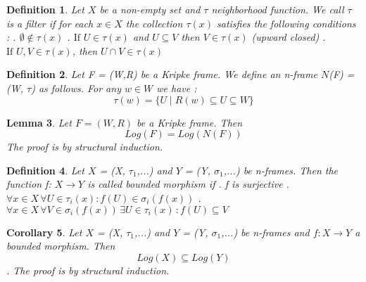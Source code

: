 \documentclass[12pt, a4paper]{scrartcl}
\newtheorem{definition}{Definition}[subsection]
\newtheorem{lemma}[definition]{Lemma}
\newtheorem{corollary}[definition]{Corollary}
\begin{document}
\begin{definition}
    Let $X$ be a non-empty set and $\tau$ neighborhood function. We call $\tau$ is a filter if for each $x\in X$ the collection $\tau(x)$
    satisfies the following conditions : \newline {}. $\emptyset \notin \tau(x)$ . $\mbox{If }U \in \tau(x)$ and $U \subseteq V$ then $V \in \tau(x)$ (upward closed) . $\mbox{If }U, V \in \tau(x)$, then $U \cap V \in \tau(x)$
\end{definition}


\begin{definition}
    Let F = (W,R) be a Kripke frame. We define an n-frame $N$(F) = (W, $\tau$) as follows.
    For any $w\in W$ we have :
    $$\tau(w) = \{ U \mid R(w) \subseteq U \subseteq W \}$$
        
\end{definition}

\vspace{0.5cm}
\begin{lemma}

    Let $F = (W,R)$ be a Kripke frame. Then $$Log(F) = Log(N(F))$$ 
    The proof is by structural induction.
\end{lemma}

\vspace{0.5cm}

\begin{definition}
    Let $X$ = (X, $\tau_1$,...) and $Y$ = (Y, $\sigma_1$,...) be n-frames. Then the function f:
    $X \rightarrow Y$ is called bounded morphism if \newline {}. f is surjective . $\forall x\in X \, \forall U \in \tau_i(x) : f(U) \in \sigma_i (f(x))$ . $\forall x\in X \, \forall V \in \sigma_i (f(x)) \, \exists U \in \tau_i(x) \, : f(U) \subseteq V$        
\end{definition}

\begin{corollary}
     Let $X$ = (X, $\tau_1$,...) and $Y$ = (Y, $\sigma_1$,...) be n-frames and $f : X \rightarrow Y$ a bounded morphism. Then 
     $$Log(X) \subseteq Log(Y)$$. \newline
     The proof is by structural induction.
\end{corollary}
\end{document}
